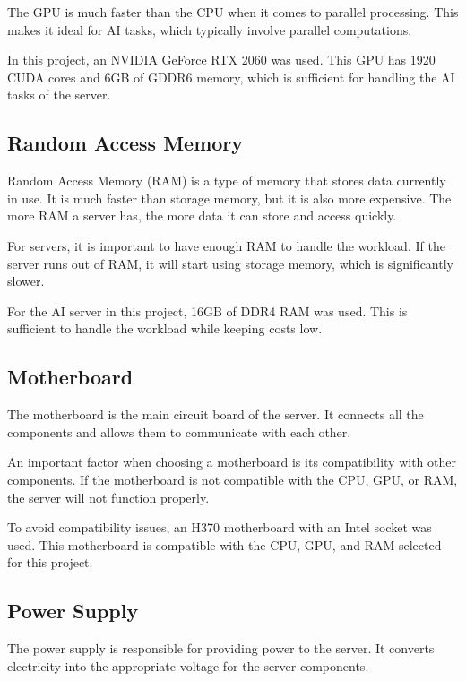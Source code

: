 The GPU is much faster than the CPU when it comes to parallel processing. This makes it ideal for AI tasks, which typically involve parallel computations.

In this project, an NVIDIA GeForce RTX 2060 was used. This GPU has 1920 CUDA cores and 6GB of GDDR6 memory, which is sufficient for handling the AI tasks of the server.

\cite{GPUwiki}
\cite{GF2060}

\subsection{Random Access Memory}

Random Access Memory (RAM) is a type of memory that stores data currently in use. It is much faster than storage memory, but it is also more expensive. The more RAM a server has, the more data it can store and access quickly.

For servers, it is important to have enough RAM to handle the workload. If the server runs out of RAM, it will start using storage memory, which is significantly slower.

For the AI server in this project, 16GB of DDR4 RAM was used. This is sufficient to handle the workload while keeping costs low.

\cite{RAMwiki}

\subsection{Motherboard}

The motherboard is the main circuit board of the server. It connects all the components and allows them to communicate with each other.

An important factor when choosing a motherboard is its compatibility with other components. If the motherboard is not compatible with the CPU, GPU, or RAM, the server will not function properly.

To avoid compatibility issues, an H370 motherboard with an Intel socket was used. This motherboard is compatible with the CPU, GPU, and RAM selected for this project.

\cite{Motherboard}

\subsection{Power Supply}

The power supply is responsible for providing power to the server. It converts electricity into the appropriate voltage for the server components.

